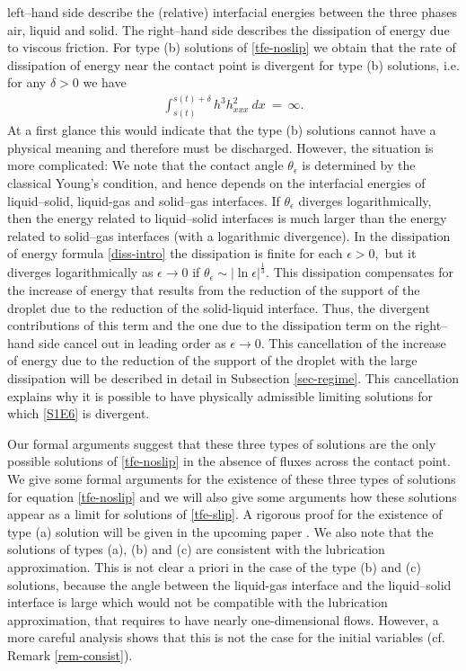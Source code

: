 \documentclass[pagesize,pdftex]{amsart}
\renewcommand{\d}{\delta}
\newcommand{\eps}{\epsilon}
\newcommand{\ang}{\theta}
\begin{document}
left--hand side describe the (relative) interfacial energies between the three
phases air, liquid and solid. The right--hand side describes the dissipation of
energy due to viscous friction.  For type (b) solutions of \eqref{tfe-noslip} we
obtain that the rate of dissipation of energy near the contact point is
divergent for type (b) solutions, i.e. for any $\d >0$ we have
\begin{align}  \label{S1E6} %
\int_{s(t) }^{s(t) + \d}h^3 h_{xxx}^2 \ dx  \ = \ \infty.
\end{align}%
At a first glance this would indicate that the type (b) solutions cannot have a
physical meaning and therefore must be discharged. However, the situation is
more complicated: We note that the contact angle $\ang_{\eps }$ is determined by
the classical Young's condition, and hence depends on the interfacial energies of
liquid--solid, liquid-gas and solid--gas interfaces. If $\ang_{\eps }$ diverges
logarithmically, then the energy related to liquid--solid interfaces is much
larger than the energy related to solid--gas interfaces (with a logarithmic
divergence). In the dissipation of energy formula \eqref{diss-intro} the
dissipation is finite for each $\eps >0,$ but it diverges logarithmically as
$\eps \to 0$ if $\ang_\eps \sim |\ln \eps|^{\frac 13}$. This dissipation
compensates for the increase of energy that results from the reduction of the
support of the droplet due to the reduction of the solid-liquid interface. Thus,
the divergent contributions of this term and the one due to the dissipation term
on the right--hand side cancel out in leading order as $\eps \to 0$. This
cancellation of the increase of energy due to the reduction of the support of
the droplet with the large dissipation will be described in detail in Subsection
\ref{sec-regime}. This cancellation explains why it is possible to have
physically admissible limiting solutions for which \eqref{S1E6} is divergent.

\medskip

Our formal arguments suggest that these three types of solutions are the only
possible solutions of \eqref{tfe-noslip} in the absence of fluxes across the
contact point. We give some formal arguments for the existence of these three
types of solutions for equation \eqref{tfe-noslip} and we will also give some
arguments how these solutions appear as a limit for solutions of
\eqref{tfe-slip}. A rigorous proof for the existence of type (a) solution will
be given in the upcoming paper \cite{GKV-preprint}. We also note that the
solutions of types (a), (b) and (c) are consistent with the lubrication
approximation.  This is not clear a priori in the case of the type (b) and (c)
solutions, because the angle between the liquid-gas interface and the
liquid--solid interface is large which would not be compatible with the
lubrication approximation, that requires to have nearly one-dimensional
flows. However, a more careful analysis shows that this is not the case for the
initial variables (cf. Remark \ref{rem-consist}).
\end{document}
